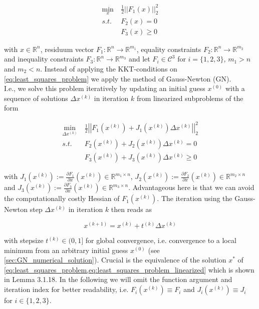 \documentclass{scrartcl}[12pt, halfparskip]
\numberwithin{equation}{section}
\numberwithin{figure}{section}
\numberwithin{table}{section}
\begin{document}
\begin{align}
	\min_x \ & \frac{1}{2}|| F_1(x) ||_2^2 \label{eq:least_squares_problem} \\
	s.t. \ & F_2(x) = 0 \nonumber \\
	& F_3(x) \ge 0 \nonumber
\end{align}

with $x \in \mathbb{R}^n$, residuum vector $F_1: \mathbb{R}^n \rightarrow \mathbb{R}^{m_1}$, equality constraints $F_2: \mathbb{R}^n \rightarrow \mathbb{R}^{m_2}$ and inequality constraints $F_3: \mathbb{R}^n \rightarrow \mathbb{R}^{m_3}$ and let $F_i \in \mathcal{C}^3$ for $i=\{1,2,3\}$, $m_1 > n$ and $m_2 < n$.
Instead of applying the KKT-conditions on \cref{eq:least_squares_problem} we apply the method of Gauss-Newton (GN). \\
I.e., we solve this problem iteratively by updating an initial guess $x^{(0)}$ with a sequence of solutions $\Delta x^{(k)}$ in iteration $k$ from linearized subproblems of the form

\begin{align}
\min_{\Delta x^{(k)}} \ & \frac{1}{2} \left| \left| F_1(x^{(k)}) + J_1(x^{(k)}) \Delta x^{(k)} \right|\right|_2^2 \label{eq:least_squares_problem_linearized} \\
s.t. \ & F_2(x^{(k)}) + J_2(x^{(k)}) \Delta x^{(k)} = 0 \nonumber \\
& F_3(x^{(k)}) + J_3(x^{(k)}) \Delta x^{(k)} \ge 0 \nonumber
\end{align}

with $J_1(x^{(k)}) := \frac{\partial F_1}{\partial x}(x^{(k)}) \in \mathbb{R}^{m_1 \times n}$, $J_2(x^{(k)}) := \frac{\partial F_2}{\partial x}(x^{(k)}) \in \mathbb{R}^{m_2 \times n}$ and $J_3(x^{(k)}) := \frac{\partial F_3}{\partial x}(x^{(k)}) \in \mathbb{R}^{m_3 \times n}$. Advantageous here is that we can avoid the computationally costly Hessian of $F_1(x^{(k)})$. The iteration using the Gauss-Newton step $\Delta x^{(k)}$ in iteration $k$ then reads as

\begin{equation}
x^{(k+1)} = x^{(k)} + t^{(k)} \Delta x^{(k)}
\label{eq:Gauss_Newton_iteration}
\end{equation}

with stepsize $t^{(k)} \in (0,1]$ for global convergence, i.e. convergence to a local minimum from an arbitrary initial guess $x^{(0)}$ (see \cref{sec:GN_numerical_solution}). Crucial is the equivalence of the solution $x^*$ of \cref{eq:least_squares_problem,eq:least_squares_problem_linearized} which is shown in \cite{diss_bock} Lemma 3.1.18.
In the following we will omit the function argument and iteration index for better readability, i.e. $F_i(x^{(k)}) \equiv F_i$ and $J_i(x^{(k)}) \equiv J_i$ for $i \in \{1,2,3\}$. \\
\end{document}
